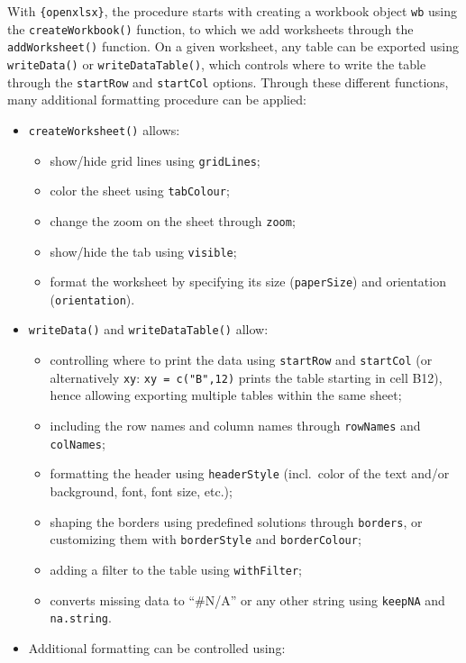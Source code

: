\documentclass[
]{book}
\providecommand{\tightlist}{%
  \setlength{\itemsep}{0pt}\setlength{\parskip}{0pt}}
\begin{document}
With \texttt{\{openxlsx\}}, the procedure starts with creating a workbook object \texttt{wb} using the \texttt{createWorkbook()} function, to which we add worksheets through the \texttt{addWorksheet()} function.
On a given worksheet, any table can be exported using \texttt{writeData()} or \texttt{writeDataTable()}, which controls where to write the table through the \texttt{startRow} and \texttt{startCol} options.
Through these different functions, many additional formatting procedure can be applied:

\begin{itemize}
\tightlist
\item
  \texttt{createWorksheet()} allows:

  \begin{itemize}
  \tightlist
  \item
    show/hide grid lines using \texttt{gridLines};
  \item
    color the sheet using \texttt{tabColour};
  \item
    change the zoom on the sheet through \texttt{zoom};
  \item
    show/hide the tab using \texttt{visible};
  \item
    format the worksheet by specifying its size (\texttt{paperSize}) and orientation (\texttt{orientation}).
  \end{itemize}
\item
  \texttt{writeData()} and \texttt{writeDataTable()} allow:

  \begin{itemize}
  \tightlist
  \item
    controlling where to print the data using \texttt{startRow} and \texttt{startCol} (or alternatively \texttt{xy}: \texttt{xy\ =\ c("B",12)} prints the table starting in cell B12), hence allowing exporting multiple tables within the same sheet;
  \item
    including the row names and column names through \texttt{rowNames} and \texttt{colNames};
  \item
    formatting the header using \texttt{headerStyle} (incl.~color of the text and/or background, font, font size, etc.);
  \item
    shaping the borders using predefined solutions through \texttt{borders}, or customizing them with \texttt{borderStyle} and \texttt{borderColour};
  \item
    adding a filter to the table using \texttt{withFilter};
  \item
    converts missing data to ``\#N/A'' or any other string using \texttt{keepNA} and \texttt{na.string}.
  \end{itemize}
\item
  Additional formatting can be controlled using:


\end{itemize}
\end{document}
